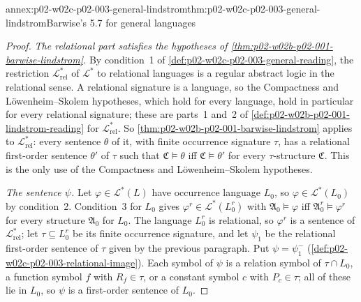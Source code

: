 \begin{annexitem}{annex:p02-w02c-p02-003-general-lindstrom}{thm:p02-w02c-p02-003-general-lindstrom}{Barwise's 5.7 for general languages}
\begin{proof}
\emph{The relational part satisfies the hypotheses of
\cref{thm:p02-w02b-p02-001-barwise-lindstrom}.}  By condition~1 of
\cref{def:p02-w02c-p02-003-general-reading}, the restriction
\(\mathcal L^{\ast}_{\mathrm{rel}}\) of \(\mathcal L^{\ast}\) to relational
languages is a regular abstract logic in the relational sense.  A
relational signature is a language, so the Compactness and
L\"owenheim--Skolem hypotheses, which hold for every language, hold in
particular for every relational signature; these are parts~1 and~2 of
\cref{def:p02-w02b-p02-001-lindstrom-reading} for
\(\mathcal L^{\ast}_{\mathrm{rel}}\).  So
\cref{thm:p02-w02b-p02-001-barwise-lindstrom} applies to
\(\mathcal L^{\ast}_{\mathrm{rel}}\): every sentence \(\theta\) of it, with
finite occurrence signature \(\tau\), has a relational first-order sentence
\(\theta'\) of \(\tau\) such that \(\mathfrak C\models\theta\) iff
\(\mathfrak C\models\theta'\) for every \(\tau\)-structure \(\mathfrak C\).
This is the only use of the Compactness and L\"owenheim--Skolem
hypotheses.

\emph{The sentence \(\psi\).}  Let \(\varphi\in\mathcal L^{\ast}(L)\) have
occurrence language \(L_0\), so \(\varphi\in\mathcal L^{\ast}(L_0)\) by
condition~2.  Condition~3 for \(L_0\) gives
\(\varphi^{r}\in\mathcal L^{\ast}(L_0^{r})\) with
\(\mathfrak A_0\models\varphi\) iff \(\mathfrak A_0^{r}\models\varphi^{r}\)
for every structure \(\mathfrak A_0\) for \(L_0\).  The language
\(L_0^{r}\) is relational, so \(\varphi^{r}\) is a sentence of
\(\mathcal L^{\ast}_{\mathrm{rel}}\); let \(\tau\subseteq L_0^{r}\) be its
finite occurrence signature, and let \(\psi_1\) be the relational
first-order sentence of \(\tau\) given by the previous paragraph.  Put
\(\psi=\psi_1^{-}\) (\cref{def:p02-w02c-p02-003-relational-image}).  Each
symbol of \(\psi\) is a relation symbol of \(\tau\cap L_0\), a function
symbol \(f\) with \(R_f\in\tau\), or a constant symbol \(c\) with
\(P_c\in\tau\); all of these lie in \(L_0\), so \(\psi\) is a first-order
sentence of \(L_0\).


\end{proof}
\end{annexitem}
